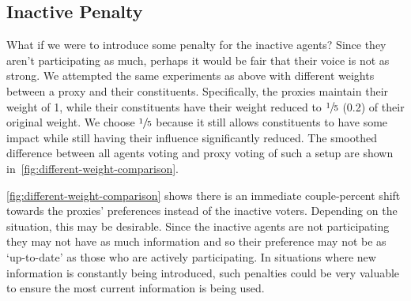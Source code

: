 \subsection{Inactive Penalty}\label{subsec:inactive-penalty}
What if we were to introduce some penalty for the inactive agents?
Since they aren't participating as much, perhaps it would be fair that their voice is
not as strong.
We attempted the same experiments as above with different weights between a proxy and
their constituents.
Specifically, the proxies maintain their weight of 1, while their constituents have
their weight reduced to $\sfrac{1}{5}$ (0.2) of their original weight.
We choose $\sfrac{1}{5}$ because it still allows constituents to have some impact
while still having their influence significantly reduced.
The smoothed difference between all agents voting and proxy voting of such a setup are
shown in~\autoref{fig:different-weight-comparison}.

\autoref{fig:different-weight-comparison}
shows there is an immediate couple-percent shift towards the proxies' preferences
instead of the inactive voters.
Depending on the situation, this may be desirable.
Since the inactive agents are not participating they may not have as much information
and so their preference may not be as `up-to-date' as those who are actively
participating.
In situations where new information is constantly being introduced, such penalties
could be very valuable to ensure the most current information is being used.

